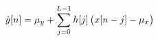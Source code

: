 \documentclass[preview]{standalone}
\begin{document}
\begin{align*}
\special{dvisvgm:raw <g id='unique000'>}\hat{y}[n]=\mu_y+\sum_{j=0}^{L-1} h[j]\,\big(x[n-j]-\mu_x\big)\special{dvisvgm:raw </g>}
\end{align*}
\end{document}
